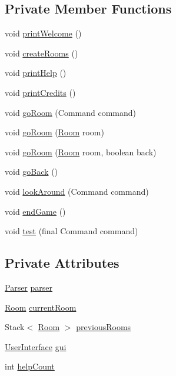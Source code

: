 \subsection*{Private Member Functions}
\begin{DoxyCompactItemize}
\item 
void \hyperlink{classGameEngine_a9a2f3cb921bb19399e357bf14d26425b}{print\-Welcome} ()
\item 
void \hyperlink{classGameEngine_ac32e0d61566d0cca0a1683b5fcf37a00}{create\-Rooms} ()
\item 
void \hyperlink{classGameEngine_a8959e384cc77e69ab0ce9da8ba5057cd}{print\-Help} ()
\item 
void \hyperlink{classGameEngine_a0cc83a912708431a667e73c9a8aa3698}{print\-Credits} ()
\item 
void \hyperlink{classGameEngine_a2ec577574f345764435837fc0204b2e0}{go\-Room} (Command command)
\item 
void \hyperlink{classGameEngine_a09acb51b95ec98aed78d928f91e61a3d}{go\-Room} (\hyperlink{classRoom}{Room} room)
\item 
void \hyperlink{classGameEngine_ae847246e53c53b84787eec490aedf9ad}{go\-Room} (\hyperlink{classRoom}{Room} room, boolean back)
\item 
void \hyperlink{classGameEngine_ac22dcdb540cb27f39597ee4f03ad167a}{go\-Back} ()
\item 
void \hyperlink{classGameEngine_ab620e2e6c8627aba28cc2c33fefe50e3}{look\-Around} (Command command)
\item 
void \hyperlink{classGameEngine_abebbf1bda82aa3ca162f7187a64e41ed}{end\-Game} ()
\item 
void \hyperlink{classGameEngine_a0cfc6fc69e60ffe8a436d04de0938349}{test} (final Command command)
\end{DoxyCompactItemize}
\subsection*{Private Attributes}
\begin{DoxyCompactItemize}
\item 
\hyperlink{classParser}{Parser} \hyperlink{classGameEngine_a2e0d2b1fa2961a930e58e5e6102dc89b}{parser}
\item 
\hyperlink{classRoom}{Room} \hyperlink{classGameEngine_aa08e7cbb458047a2f72ff594d2e230bc}{current\-Room}
\item 
Stack$<$ \hyperlink{classRoom}{Room} $>$ \hyperlink{classGameEngine_a46c905c0610d22223520a8db0e519ec1}{previous\-Rooms}
\item 
\hyperlink{classUserInterface}{User\-Interface} \hyperlink{classGameEngine_a2a7d0bb6183b3f3ef3ee2008926374a0}{gui}
\item 
int \hyperlink{classGameEngine_a308a9926d553d53cb4c56c28588f6c62}{help\-Count}
\end{DoxyCompactItemize}


